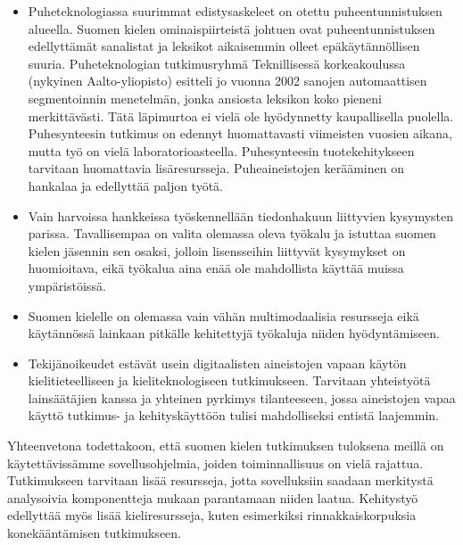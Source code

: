 \documentclass[]{../../metanetpaper}
\begin{document}
\begin{Parallel}[c]{70mm}{70mm}
{\begin{itemize}
\item Puheteknologiassa suurimmat edistysaskeleet on otettu
    puheentunnistuksen alueella. Suomen kielen ominaispiirteistä
    johtuen ovat puheentunnistuksen edellyttämät sanalistat ja
    leksikot aikaisemmin olleet epäkäytännöllisen suuria.
    Puheteknologian tutkimusryhmä Teknillisessä korkeakoulussa
    (nykyinen Aalto-yliopisto) esitteli jo vuonna 2002 sanojen
    automaattisen segmentoinnin menetelmän, jonka ansiosta leksikon
    koko pieneni merkittävästi. Tätä läpimurtoa ei vielä ole
    hyödynnetty kaupallisella puolella. Puhesynteesin tutkimus on
    edennyt huomattavasti viimeisten vuosien aikana, mutta työ on
    vielä laboratorioasteella. Puhesynteesin tuotekehitykseen
    tarvitaan huomattavia lisäresursseja. Puheaineistojen kerääminen
    on hankalaa ja edellyttää paljon työtä.

\item Vain harvoissa hankkeissa työskennellään tiedonhakuun liittyvien
    kysymysten parissa. Tavallisempaa on valita olemassa oleva työkalu
    ja istuttaa suomen kielen jäsennin sen osaksi, jolloin
    lisensseihin liittyvät kysymykset on huomioitava, eikä työkalua
    aina enää ole mahdollista käyttää muissa ympäristöissä.

\item Suomen kielelle on olemassa vain vähän multimodaalisia
    resursseja eikä käytännössä lainkaan pitkälle kehitettyjä
    työkaluja niiden hyödyntämiseen.

\item Tekijänoikeudet estävät usein digitaalisten aineistojen vapaan
    käytön kielitieteelliseen ja kieliteknologiseen
    tutkimukseen. Tarvitaan yhteistyötä lainsäätäjien kanssa ja
    yhteinen pyrkimys tilanteeseen, jossa aineistojen vapaa käyttö
    tutkimus- ja kehityskäyttöön tulisi mahdolliseksi entistä
    laajemmin.
\end{itemize}
Yhteenvetona todettakoon, että suomen kielen tutkimuksen tuloksena
meillä on käytettävissämme sovellusohjelmia, joiden toiminnallisuus on
vielä rajattua.  Tutkimukseen tarvitaan lisää resursseja, jotta
sovelluksiin saadaan merkitystä analysoivia komponentteja mukaan
parantamaan niiden laatua. Kehitystyö edellyttää myös lisää
kieliresursseja, kuten esimerkiksi rinnakkaiskorpuksia konekääntämisen
tutkimukseen.
}

\end{Parallel}
\end{document}
